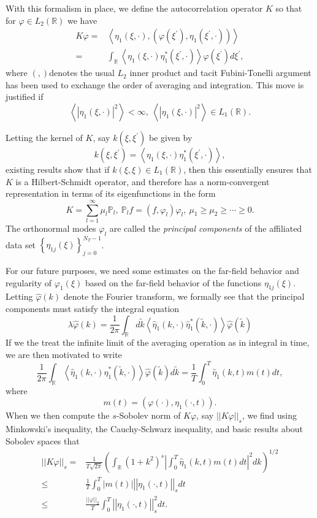 \documentclass[a4paper,11pt]{article}
\newcommand{\gnorm}[1]{\left|\left| #1\right|\right|}
\begin{document}
With this formalism in place, we define the autocorrelation operator $K$ so that for $\varphi\in L_{2}(\mathbb{R})$ we have 
\begin{align*}
K\varphi = & \left<\eta_{1}(\xi,\cdot),\left(\varphi(\xi^{'}),\eta_{1}(\xi^{'},\cdot)\right) \right>\\
= & \int_{\mathbb{R}}\left<\eta_{1}(\xi,\cdot)\eta^{\ast}_{1}(\xi^{'},\cdot) \right>\varphi(\xi^{'})d\xi^{'},
\end{align*}
where $\left(,\right)$denotes the usual $L_{2}$ inner product and tacit Fubini-Tonelli argument has been used to exchange the order of averaging and integration.  This move is justified if 
\[
\left<\left|\eta_{1}(\xi,\cdot)\right|^{2}\right> < \infty, ~ \left<\left|\eta_{1}(\xi,\cdot)\right|^{2}\right>  \in L_{1}(\mathbb{R}).
\]   

Letting the kernel of $K$, say $k(\xi,\xi^{'})$ be given by 
\[
k(\xi,\xi^{'}) = \left<\eta_{1}(\xi,\cdot)\eta^{\ast}_{1}(\xi^{'},\cdot) \right>,
\]
existing results show that if $k(\xi,\xi)\in L_{1}(\mathbb{R})$, then this essentially ensures that $K$ is a Hilbert-Schmidt operator, and therefore has a norm-convergent representation in terms of its eigenfunctions in the form 
\[
K = \sum_{l=1}^{\infty}\mu_{l} \mathbb{P}_{l}, ~ \mathbb{P}_{l}f = \left(f,\varphi_{l}\right)\varphi_{l}, ~ \mu_{1}\geq \mu_{2}\geq \cdots \geq 0.
\]
The orthonormal modes $\varphi_{l}$ are called the {\it principal components} of the affiliated data set $\left\{\eta_{1j}(\xi)\right\}_{j=0}^{N_{T}-1}$.  

For our future purposes, we need some estimates on the far-field behavior and regularity of $\varphi_{1}(\xi)$ based on the far-field behavior of the functions $\eta_{1j}(\xi)$.  Letting $\hat{\varphi}(k)$ denote the Fourier transform, we formally see that the principal components must satisfy the integral equation
\[
\lambda \hat{\varphi}(k) = \frac{1}{2\pi}\int_{\mathbb{R}}d\tilde{k}\left<\hat{\eta}_{1}(k,\cdot)\hat{\eta}^{\ast}_{1}(\tilde{k},\cdot) \right> \hat{\varphi}(\tilde{k})
\]
If we the treat the infinite limit of the averaging operation as in integral in time, we are then motivated to write 
\[
\frac{1}{2\pi}\int_{\mathbb{R}}\left<\hat{\eta}_{1}(k,\cdot)\hat{\eta}^{\ast}_{1}(\tilde{k},\cdot) \right> \hat{\varphi}(\tilde{k})d\tilde{k} = \frac{1}{T}\int_{0}^{T} \hat{\eta}_{1}(k,t)m(t) dt,
\]
where 
\[
m(t) = \left(\varphi(\cdot),\eta_{1}(\cdot,t)\right).
\]
When we then compute the $s$-Sobolev norm of $K\varphi$, say $\gnorm{K\varphi}_{s}$, we find using Minkowski's inequality, the Cauchy-Schwarz inequality, and basic results about Sobolev spaces that  
\begin{align*}
\gnorm{K\varphi}_{s} = & \frac{1}{T\sqrt{2\pi}}\left(\int_{\mathbb{R}}\left(1+k^{2}\right)^{s}\left|\int_{0}^{T} \hat{\eta}_{1}(k,t) m(t) dt \right|^{2} dk\right)^{1/2}\\
\leq & \frac{1}{T}\int_{0}^{T}\left|m(t)\right|\gnorm{\eta_{1}(\cdot,t)}_{s}dt\\
\leq & \frac{\gnorm{\varphi}_{2}}{T}\int_{0}^{T}\gnorm{\eta_{1}(\cdot,t)}^{2}_{s}dt.
\end{align*}
\end{document}
